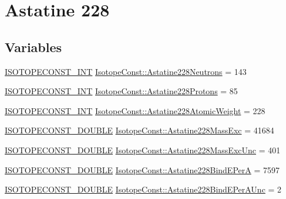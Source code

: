 \hypertarget{group___isotope_const-_astatine-_at228}{}\section{Astatine 228}
\label{group___isotope_const-_astatine-_at228}
\subsection*{Variables}
\begin{DoxyCompactItemize}
\item 
\mbox{\hyperlink{group___isotope_const-_macros_ga5f18360b3e99483a35c32d789e62621c}{I\+S\+O\+T\+O\+P\+E\+C\+O\+N\+S\+T\+\_\+\+I\+NT}} \mbox{\hyperlink{group___isotope_const-_astatine-_at228_ga8d53e32ff38b716738ac2441010deb75}{Isotope\+Const\+::\+Astatine228\+Neutrons}} = 143
\item 
\mbox{\hyperlink{group___isotope_const-_macros_ga5f18360b3e99483a35c32d789e62621c}{I\+S\+O\+T\+O\+P\+E\+C\+O\+N\+S\+T\+\_\+\+I\+NT}} \mbox{\hyperlink{group___isotope_const-_astatine-_at228_gaf65e2731d004df15af9e16dfffce0fb1}{Isotope\+Const\+::\+Astatine228\+Protons}} = 85
\item 
\mbox{\hyperlink{group___isotope_const-_macros_ga5f18360b3e99483a35c32d789e62621c}{I\+S\+O\+T\+O\+P\+E\+C\+O\+N\+S\+T\+\_\+\+I\+NT}} \mbox{\hyperlink{group___isotope_const-_astatine-_at228_gae1ccedf3b64e0d3cd20579a6683537c2}{Isotope\+Const\+::\+Astatine228\+Atomic\+Weight}} = 228
\item 
\mbox{\hyperlink{group___isotope_const-_macros_ga8f45a7272ce02c0b4c65c44636ed719a}{I\+S\+O\+T\+O\+P\+E\+C\+O\+N\+S\+T\+\_\+\+D\+O\+U\+B\+LE}} \mbox{\hyperlink{group___isotope_const-_astatine-_at228_gae26a2d048edaa243214f5557e19c9bb7}{Isotope\+Const\+::\+Astatine228\+Mass\+Exc}} = 41684
\item 
\mbox{\hyperlink{group___isotope_const-_macros_ga8f45a7272ce02c0b4c65c44636ed719a}{I\+S\+O\+T\+O\+P\+E\+C\+O\+N\+S\+T\+\_\+\+D\+O\+U\+B\+LE}} \mbox{\hyperlink{group___isotope_const-_astatine-_at228_ga34f5d2ea009faa9eec89c4b762e9672d}{Isotope\+Const\+::\+Astatine228\+Mass\+Exc\+Unc}} = 401
\item 
\mbox{\hyperlink{group___isotope_const-_macros_ga8f45a7272ce02c0b4c65c44636ed719a}{I\+S\+O\+T\+O\+P\+E\+C\+O\+N\+S\+T\+\_\+\+D\+O\+U\+B\+LE}} \mbox{\hyperlink{group___isotope_const-_astatine-_at228_gab1d7e1be27b5099fff8069cd356759a7}{Isotope\+Const\+::\+Astatine228\+Bind\+E\+PerA}} = 7597
\item 
\mbox{\hyperlink{group___isotope_const-_macros_ga8f45a7272ce02c0b4c65c44636ed719a}{I\+S\+O\+T\+O\+P\+E\+C\+O\+N\+S\+T\+\_\+\+D\+O\+U\+B\+LE}} \mbox{\hyperlink{group___isotope_const-_astatine-_at228_ga5948ee66815a15885b744d93dfaf6491}{Isotope\+Const\+::\+Astatine228\+Bind\+E\+Per\+A\+Unc}} = 2

\end{DoxyCompactItemize}
